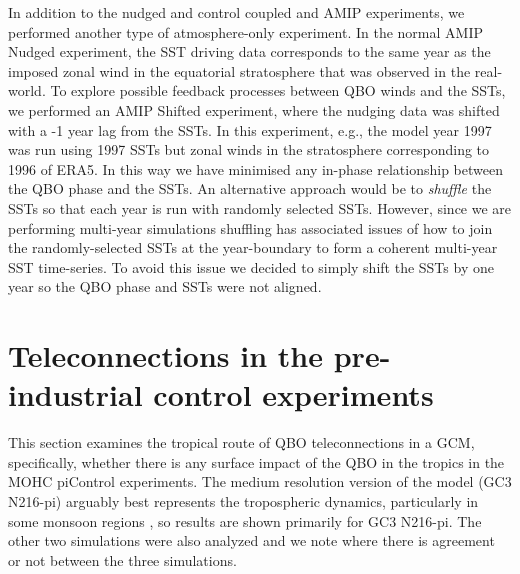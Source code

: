 In addition to the nudged and control coupled and AMIP experiments, we performed another type of atmosphere-only experiment. In the normal AMIP Nudged experiment, the SST driving data corresponds to the same year as the imposed zonal wind in the equatorial stratosphere that was observed in the real-world. To explore possible feedback processes between QBO winds and the SSTs, we performed an AMIP Shifted experiment, where the nudging data was shifted with a -1 year lag from the SSTs. In this experiment, e.g., the model year 1997 was run using 1997 SSTs but zonal winds in the stratosphere corresponding to 1996 of ERA5. In this way we have minimised any in-phase relationship between the QBO phase and the SSTs. An alternative approach would be to \textit{shuffle} the SSTs so that each year is run with randomly selected SSTs. However, since we are performing multi-year simulations shuffling has associated issues of how to join the randomly-selected SSTs at the year-boundary to form a coherent multi-year SST time-series. To avoid this issue we decided to simply shift the SSTs by one year so the QBO phase and SSTs were not aligned.

  
\section{Teleconnections in the pre-industrial control experiments}\label{sq:cmip6_qbo}




This section examines the tropical route of QBO teleconnections in a GCM, specifically, whether there is any surface impact of the QBO in the tropics in the MOHC piControl experiments.
The medium resolution version of the model (GC3 N216-pi) arguably best represents the tropospheric dynamics, particularly in some monsoon regions \citep{garciafranco2020}, so results are shown primarily for GC3 N216-pi. The other two simulations were also analyzed and we note where there is agreement or not between the three simulations.

